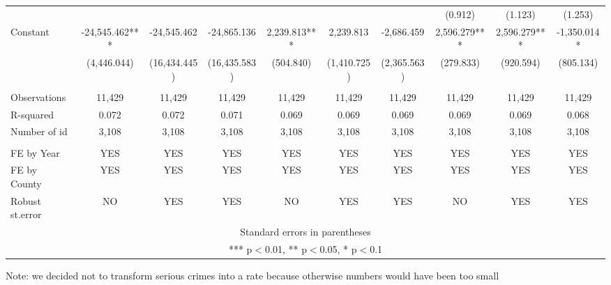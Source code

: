 \documentclass[a4paper,12pt]{article}
\begin{document}
\begin{landscape}
\begin{table}[h!]
\begin{center}
{\begin{tabular}{l c c c c c c c c c}
 &  &  &  &  &  &  & (0.912) & (1.123) & (1.253) \\
Constant & -24,545.462*** & -24,545.462 & -24,865.136 & 2,239.813*** & 2,239.813 & -2,686.459 & 2,596.279*** & 2,596.279*** & -1,350.014* \\
 & (4,446.044) & (16,434.445) & (16,435.583) & (504.840) & (1,410.725) & (2,365.563) & (279.833) & (920.594) & (805.134) \\
 &  &  &  &  &  &  &  &  &  \\
Observations & 11,429 & 11,429 & 11,429 & 11,429 & 11,429 & 11,429 & 11,429 & 11,429 & 11,429 \\
R-squared & 0.072 & 0.072 & 0.071 & 0.069 & 0.069 & 0.069 & 0.069 & 0.069 & 0.068 \\
 Number of id & 3,108 & 3,108 & 3,108 & 3,108 & 3,108 & 3,108 & 3,108 & 3,108 & 3,108 \\
\hline \hline
 &  &  &  &  &  &  &  &  &  \\
FE by Year & YES & YES & YES & YES & YES & YES & YES & YES & YES \\
FE by County & YES & YES & YES & YES & YES & YES & YES & YES & YES \\
Robust st.error & NO & YES & YES & NO & YES & YES & NO & YES & YES \\
\hline \hline
\multicolumn{10}{c}{ Standard errors in parentheses} \\
\multicolumn{10}{c}{ *** p$<$0.01, ** p$<$0.05, * p$<$0.1} \\
\end{tabular}
}
\begin{tablenotes}
\begin{footnotesize}
Note: we decided not to transform serious crimes into a rate because otherwise numbers would have been too small
\end{footnotesize}
\end{tablenotes}
\end{center}
\end{table}
\end{landscape}
\end{document}
